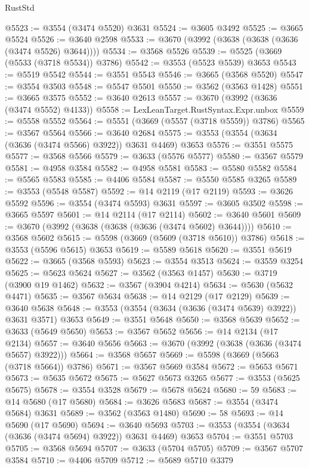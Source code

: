 \begin{lexlean}{RustStd}
\begin{coremodule}
@5523 := @3554 (@3474 @5520) @3631
@5524 := @3605 @3492
@5525 := @3665 @5524
@5526 := @3640 @2598
@5533 := @3670 (@3992 (@3638 (@3638 (@3636 (@3474 @5526) @3644))))
@5534 := @3568 @5526
@5539 := @5525 (@3669 (@5533 (@3718 @5534)) @3786)
@5542 := @3553 (@5523 @5539) @3653
@5543 := @5519 @5542
@5544 := @3551 @5543
@5546 := @3665 (@3568 @5520)
@5547 := @3554 @3503
@5548 := @5547 @5501
@5550 := @3562 (@3563 @1428)
@5551 := @3665 @3575
@5552 := @3640 @2613
@5557 := @3670 (@3992 (@3636 (@3474 @5552) @4133))
@5558 := LexLeanTarget.RustSyntax.Expr.unbox
@5559 := @5558 @5552
@5564 := @5551 (@3669 (@5557 (@3718 @5559)) @3786)
@5565 := @3567 @5564
@5566 := @3640 @2684
@5575 := @3553 (@3554 (@3634 (@3636 (@3474 @5566) @3922)) @3631 @4469) @3653
@5576 := @3551 @5575
@5577 := @3568 @5566
@5579 := @3633 (@5576 @5577)
@5580 := @3567 @5579
@5581 := @4958 @3584
@5582 := @4958 @5581
@5583 := @5580 @5582
@5584 := @5565 @5583
@5585 := @4406 @5584
@5587 := @5550 @5585 @3265
@5589 := @3553 (@5548 @5587)
@5592 := @14 @2119 (@17 @2119)
@5593 := @3626 @5592
@5596 := @3554 (@3474 @5593) @3631
@5597 := @3605 @3502
@5598 := @3665 @5597
@5601 := @14 @2114 (@17 @2114)
@5602 := @3640 @5601
@5609 := @3670 (@3992 (@3638 (@3638 (@3636 (@3474 @5602) @3644))))
@5610 := @3568 @5602
@5615 := @5598 (@3669 (@5609 (@3718 @5610)) @3786)
@5618 := @3553 (@5596 @5615) @3653
@5619 := @5589 @5618
@5620 := @3551 @5619
@5622 := @3665 (@3568 @5593)
@5623 := @3554 @3513
@5624 := @3559 @3254
@5625 := @5623 @5624
@5627 := @3562 (@3563 @1457)
@5630 := @3719 (@3900 @19 @1462)
@5632 := @3567 (@3904 @4214)
@5634 := @5630 (@5632 @4471)
@5635 := @3567 @5634
@5638 := @14 @2129 (@17 @2129)
@5639 := @3640 @5638
@5648 := @3553 (@3554 (@3634 (@3636 (@3474 @5639) @3922)) @3631 @3571) @3653
@5649 := @3551 @5648
@5650 := @3568 @5639
@5652 := @3633 (@5649 @5650)
@5653 := @3567 @5652
@5656 := @14 @2134 (@17 @2134)
@5657 := @3640 @5656
@5663 := @3670 (@3992 (@3638 (@3636 (@3474 @5657) @3922)))
@5664 := @3568 @5657
@5669 := @5598 (@3669 (@5663 (@3718 @5664)) @3786)
@5671 := @3567 @5669 @3584
@5672 := @5653 @5671
@5673 := @5635 @5672
@5675 := @5627 @5673 @3265
@5677 := @3553 (@5625 @5675)
@5678 := @3554 @3528
@5679 := @5678 @5624
@5680 := 59
@5683 := @14 @5680 (@17 @5680)
@5684 := @3626 @5683
@5687 := @3554 (@3474 @5684) @3631
@5689 := @3562 (@3563 @1480)
@5690 := 58
@5693 := @14 @5690 (@17 @5690)
@5694 := @3640 @5693
@5703 := @3553 (@3554 (@3634 (@3636 (@3474 @5694) @3922)) @3631 @4469) @3653
@5704 := @3551 @5703
@5705 := @3568 @5694
@5707 := @3633 (@5704 @5705)
@5709 := @3567 @5707 @3584
@5710 := @4406 @5709
@5712 := @5689 @5710 @3379

\end{coremodule}
\end{lexlean}
